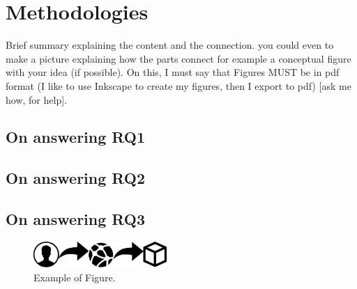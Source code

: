 \section{Methodologies}
\label{sec:methodologies}

Brief summary explaining the content and the connection.
you could even to make a picture explaining how the parts connect for example a conceptual figure with your idea (if possible).
On this, I must say that Figures MUST be in pdf format (I like to use Inkscape to create my figures, then I export to pdf) [ask me how, for help].

\subsection{On answering RQ1}
\label{subsec:on-answering-rq1}

\subsection{On answering RQ2}
\label{subsec:on-answering-rq2}

\subsection{On answering RQ3}
\label{subsec:on-answering-rq3}

\begin{figure}[h!]
	\label{fig:figure}
	\centering
	\includegraphics[width=0.45\textwidth]{figs/example}
	\caption{Example of Figure.}
\end{figure}